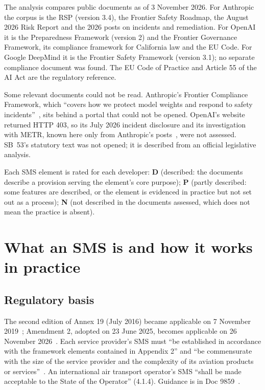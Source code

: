 \documentclass[11pt]{article}
\begin{document}
The analysis compares public documents as of 3 November 2026. For Anthropic the corpus is the RSP (version 3.4), the Frontier Safety Roadmap, the August 2026 Risk Report and the 2026 posts on incidents and remediation. For OpenAI it is the Preparedness Framework (version 2) and the Frontier Governance Framework, its compliance framework for California law and the EU Code. For Google DeepMind it is the Frontier Safety Framework (version 3.1); no separate compliance document was found. The EU Code of Practice and Article 55 of the AI Act are the regulatory reference.

Some relevant documents could not be read. Anthropic's Frontier Compliance Framework, which ``covers how we protect model weights and respond to safety incidents''~\cite{anthropic2025fcf}, sits behind a portal that could not be opened. OpenAI's website returned HTTP 403, so its July 2026 incident disclosure and its investigation with METR, known here only from Anthropic's posts~\cite{anthropic2026aisi,anthropic2026threeincidents}, were not assessed. SB~53's statutory text was not opened; it is described from an official legislative analysis.

Each SMS element is rated for each developer: \textbf{D} (described: the documents describe a provision serving the element's core purpose); \textbf{P} (partly described: some features are described, or the element is evidenced in practice but not set out as a process); \textbf{N} (not described in the documents assessed, which does not mean the practice is absent).

\section{What an SMS is and how it works in practice}\label{sec:sms}

\subsection{Regulatory basis}\label{sec:regbasis}

The second edition of Annex 19 (July 2016) became applicable on 7 November 2019~\cite{icao2016annex19}; Amendment 2, adopted on 23 June 2025, becomes applicable on 26 November 2026~\cite{icao2025amdt2}. Each service provider's SMS must ``be established in accordance with the framework elements contained in Appendix 2'' and ``be commensurate with the size of the service provider and the complexity of its aviation products or services''~\cite[4.1.1]{icao2016annex19}. An international air transport operator's SMS ``shall be made acceptable to the State of the Operator'' (4.1.4). Guidance is in Doc 9859~\cite{icao2018doc9859}.
\end{document}
